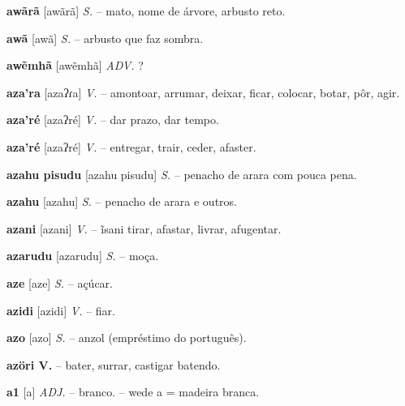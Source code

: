\textbf{awãrã} [awãrã] \textit{S.} -- mato, nome de árvore, arbusto reto.

\textbf{awã} [awã] \textit{S.} -- arbusto que faz sombra.

\textbf{awẽmhã} [awẽmhã] \textit{ADV.} ?

\textbf{aza'ra} [azaʔɾa] \textit{V.} -- amontoar, arrumar, deixar, ficar, colocar, botar, pôr, agir.

\textbf{aza'ré} [azaʔré] \textit{V.} -- dar prazo, dar tempo.

\textbf{aza'ré} [azaʔré] \textit{V.} -- entregar, trair, ceder, afaster.

\textbf{azahu pisudu} [azahu pisudu] \textit{S.} -- penacho de arara com pouca pena.

\textbf{azahu} [azahu] \textit{S.} -- penacho de arara e outros.

\textbf{azani} [azani] \textit{V.} -- ĩsani tirar, afastar, livrar, afugentar.

\textbf{azarudu} [azarudu] \textit{S.} -- moça.

\textbf{aze} [aze] \textit{S.} -- açúcar.

\textbf{azidi} [azidi] \textit{V.} -- fiar.

\textbf{azo} [azo] \textit{S.} -- anzol (empréstimo do português).

\textbf{azöri V.} -- bater, surrar, castigar batendo.

\textbf{a1} [a] \textit{ADJ.} -- branco. -- wede a = madeira branca.

